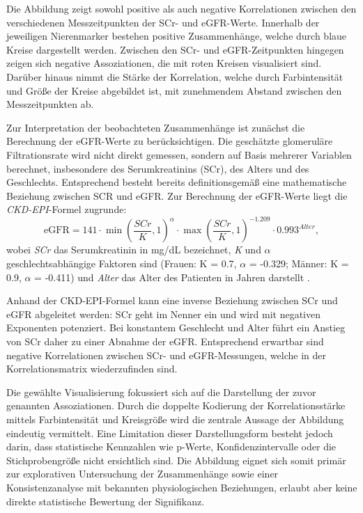 \documentclass[a4paper,12pt]{article}
\begin{document}
Die Abbildung zeigt sowohl positive als auch negative Korrelationen zwischen den verschiedenen Messzeitpunkten der SCr- und eGFR-Werte. Innerhalb der jeweiligen Nierenmarker bestehen positive Zusammenhänge, welche durch blaue Kreise dargestellt werden. Zwischen den SCr- und eGFR-Zeitpunkten hingegen zeigen sich negative Assoziationen, die mit roten Kreisen visualisiert sind. Darüber hinaus nimmt die Stärke der Korrelation, welche durch Farbintensität und Größe der Kreise abgebildet ist, mit zunehmendem Abstand zwischen den Messzeitpunkten ab.

Zur Interpretation der beobachteten Zusammenhänge ist zunächst die Berechnung der eGFR-Werte zu berücksichtigen. Die geschätzte glomeruläre Filtrationsrate wird nicht direkt gemessen, sondern auf Basis mehrerer Variablen berechnet, insbesondere des Serumkreatinins (SCr), des Alters und des Geschlechts. Entsprechend besteht bereits definitionsgemäß eine mathematische Beziehung zwischen SCR und eGFR. Zur Berechnung der eGFR-Werte liegt die \textit{CKD-EPI}-Formel zugrunde:
\[
\mathrm{eGFR} = 141 \cdot \min\left(\frac{SCr}{K}, 1\right)^\alpha \cdot \max\left(\frac{SCr}{K}, 1\right)^{-1.209} \cdot 0.993^{Alter},
\]
wobei \textit{SCr} das Serumkreatinin in mg/dL bezeichnet, \textit{K} und \textit{$\alpha$} geschlechtsabhängige Faktoren sind (Frauen: K = 0.7, $\alpha$ = -0.329; Männer: K = 0.9, $\alpha$ = -0.411) und \textit{Alter} das Alter des Patienten in Jahren darstellt \citep{DocCheckCKDEPI}. 

Anhand der CKD-EPI-Formel kann eine inverse Beziehung zwischen SCr und eGFR abgeleitet werden: SCr geht im Nenner ein und wird mit negativen Exponenten potenziert. Bei konstantem Geschlecht und Alter führt ein Anstieg von SCr daher zu einer Abnahme der eGFR. Entsprechend erwartbar sind negative Korrelationen zwischen SCr- und eGFR-Messungen, welche in der Korrelationsmatrix wiederzufinden sind.

Die gewählte Visualisierung fokussiert sich auf die Darstellung der zuvor genannten Assoziationen. Durch die doppelte Kodierung der Korrelationsstärke mittels Farbintensität und Kreisgröße wird die zentrale Aussage der Abbildung eindeutig vermittelt. Eine Limitation dieser Darstellungsform besteht jedoch darin, dass statistische Kennzahlen wie p-Werte, Konfidenzintervalle oder die Stichprobengröße nicht ersichtlich sind. Die Abbildung eignet sich somit primär zur explorativen Untersuchung der Zusammenhänge sowie einer Konsistenzanalyse mit bekannten physiologischen Beziehungen, erlaubt aber keine direkte statistische Bewertung der Signifikanz.
\end{document}
